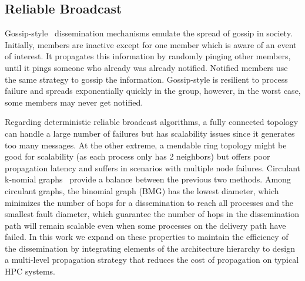 \documentclass[5p,times,twocolumn]{elsarticle}
\begin{document}
\subsection{Reliable Broadcast}
%
%
Gossip-style~\cite{infection-style,Abhinandan02} dissemination mechanisms emulate the spread of gossip in society. Initially, members are inactive except for one member which is aware of an event of interest. It propagates this information by randomly pinging other members, until it pings someone who already was already notified. Notified members use the same strategy to gossip the information. Gossip-style is resilient to process failure and spreads exponentially quickly in the group, however, in the worst case, some members may never get notified.

Regarding deterministic reliable broadcast algorithms, a fully connected topology can handle a large number of failures but has scalability issues since it generates too many messages. At the other extreme, a mendable ring topology might be good for scalability (as each process only has 2 neighbors)
but offers poor propagation latency and suffers in scenarios with multiple node failures.
Circulant k-nomial graphs~\cite{Angskun07, Pava11} provide a balance between the previous two methods.
Among circulant graphs, the binomial graph (BMG) has the lowest diameter, which minimizes the number of hops for a dissemination to reach all
processes and the smallest fault diameter, which guarantee the number of hops in the dissemination path will remain scalable even when some processes on the delivery path have failed.
In this work we expand on these properties to maintain the efficiency of the dissemination by integrating elements of the
architecture hierarchy to design a multi-level propagation strategy that
reduces the cost of propagation on typical HPC systems.
\end{document}
